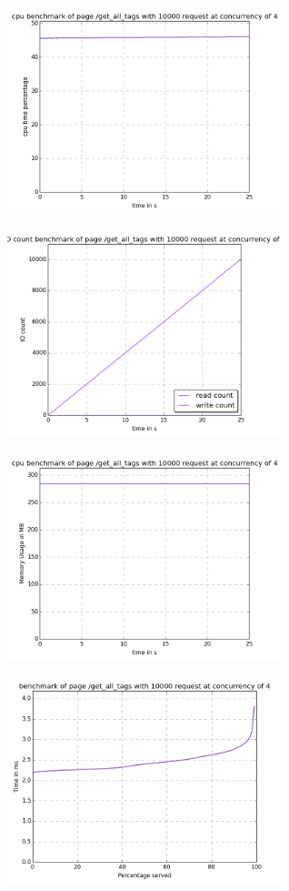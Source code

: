\begin{center}
\includegraphics[width=0.6\textwidth]{img/get_all_tags.cpu.png}



\includegraphics[width=0.6\textwidth]{img/get_all_tags.io-count.png}



\includegraphics[width=0.6\textwidth]{img/get_all_tags.mem.png}



\includegraphics[width=0.6\textwidth]{img/get_all_tags.serv-time.png}




\end{center}
